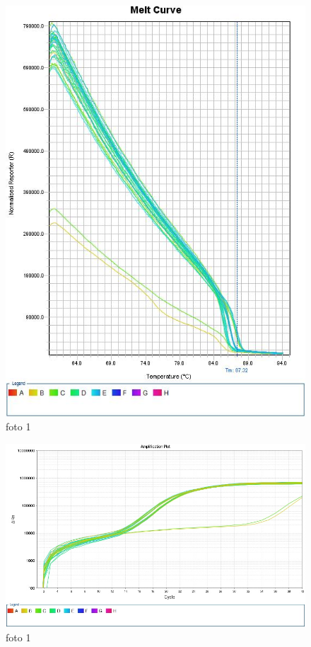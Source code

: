\begin{figure}
        \centering
        \includegraphics[width=.5\linewidth]{fig/Melt Curve.jpg}
        \caption{foto 1}
        \label{almeltc}
\end{figure}

\begin{figure}
        \centering
        \includegraphics[width=.5\linewidth]{fig/Amplification Plot.jpg}
        \caption{foto 1}
        \label{almeltc}
\end{figure}


